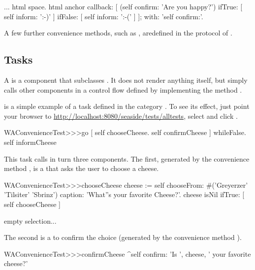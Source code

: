 \documentclass[a4paper,10pt,twoside]{book}
\begin{document}
\begin{code}{}
...
	html space.
	html anchor
		callback: [
			(self confirm: 'Are you happy?')
				ifTrue: [ self inform: ':-)' ]
				ifFalse: [ self inform: ':-(' ]
			];
		with: 'self confirm:'.
\end{code}

A few further convenience methods, such as , aredefined in the  protocol of .

\subsection{Tasks}

A  is a component that subclasses .
It does not render anything itself, but simply calls other components in a control flow
defined by implementing the method .

 is a simple example of a task defined in the category
.
To see its effect, just point your browser to
\url{http://localhost:8080/seaside/tests/alltests}, select  and
click .

\begin{code}{}
WAConvenienceTest>>>go
	[ self chooseCheese.
	  self confirmCheese ] whileFalse.
	self informCheese
\end{code}

This task calls in turn three components.
The first, generated by the convenience method , is a  that asks the user to choose a cheese.

\begin{code}{}
WAConvenienceTest>>>chooseCheese
	cheese := self
		chooseFrom: #('Greyerzer' 'Tilsiter' 'Sbrinz')
		caption: 'What''s your favorite Cheese?'.
	cheese isNil ifTrue: [ self chooseCheese ]
\end{code}

empty selection...

The second is a  to confirm the choice (generated by the
convenience method ).

\begin{code}{}
WAConvenienceTest>>>confirmCheese
	^self confirm: 'Is ', cheese,  ' your favorite cheese?'
\end{code}
\end{document}
